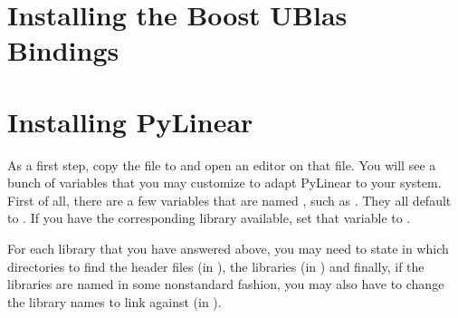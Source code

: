 \section{Installing the Boost UBlas Bindings}

\label{sec:install-bindings}


\section{Installing PyLinear}

As a first step, copy the file  to
 and open an editor on that file. You will
see a bunch of variables that you may customize to adapt
PyLinear to your system. First of all, there are a few variables
that are named , such as . They
all default to . If you have the corresponding library
available, set that variable to .

For each library that you have answered  above, you may
need to state in which directories to find the header files (in
), the libraries (in )
and finally, if the libraries are named in some nonstandard fashion,
you may also have to change the library names to link against (in
).
